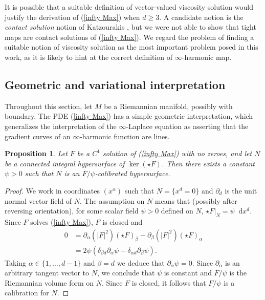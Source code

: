 \documentclass[reqno,11pt]{amsart}
\newcommand*\dif{\mathop{}\!\mathrm{d}}
\newcommand{\dfn}[1]{\emph{#1}\index{#1}}
\newtheorem{proposition}[theorem]{Proposition}
\theoremstyle{definition}
\numberwithin{equation}{section}
\begin{document}
It is possible that a suitable definition of vector-valued viscosity solution would justify the derivation of (\ref{infty Max}) when $d \geq 3$.
A candidate notion is the \dfn{contact solution} notion of Katzourakis \cite{Katzourakis2018OnAV}, but we were not able to show that tight maps are contact solutions of (\ref{infty Max}).
We regard the problem of finding a suitable notion of viscosity solution as the most important problem posed in this work, as it is likely to hint at the correct definition of $\infty$-harmonic map.

\subsection{Geometric and variational interpretation}\label{EL interpretation}
Throughout this section, let $M$ be a Riemannian manifold, possibly with boundary.
The PDE (\ref{infty Max}) has a simple geometric interpretation, which generalizes the interpretation of the $\infty$-Laplace equation as asserting that the gradient curves of an $\infty$-harmonic function are lines.

\begin{proposition}\label{infty Max calibrates}
Let $F$ be a $C^1$ solution of (\ref{infty Max}) with no zeroes, and let $N$ be a connected integral hypersurface of $\ker(\star F)$.
Then there exists a constant $\psi > 0$ such that $N$ is an $F/\psi$-calibrated hypersurface.
\end{proposition}
\begin{proof}
We work in coordinates $(x^\alpha)$ such that $N = \{x^d = 0\}$ and $\partial_d$ is the unit normal vector field of $N$.
The assumption on $N$ means that (possibly after reversing orientation), for some scalar field $\psi > 0$ defined on $N$, $\star F|_N = \psi \dif x^d$.
Since $F$ solves (\ref{infty Max}), $F$ is closed and
\begin{align*}
0 
&= \partial_\alpha(|F|^2)(\star F)_\beta - \partial_\beta(|F|^2)(\star F)_\alpha \\
&= 2\psi(\delta_{\beta d} \partial_\alpha \psi - \delta_{\alpha d} \partial_\beta \psi).
\end{align*}
Taking $\alpha \in \{1, \dots, d - 1\}$ and $\beta = d$ we deduce that $\partial_\alpha \psi = 0$.
Since $\partial_\alpha$ is an arbitrary tangent vector to $N$, we conclude that $\psi$ is constant and $F/\psi$ is the Riemannian volume form on $N$.
Since $F$ is closed, it follows that $F/\psi$ is a calibration for $N$.
\end{proof}
\end{document}
